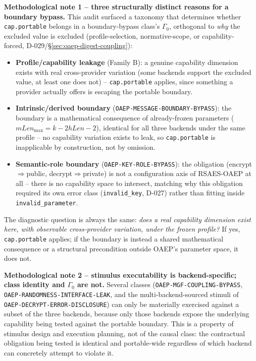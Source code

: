\documentclass[11pt,a4paper]{article}
\begin{document}
\textbf{Methodological note 1 -- three structurally distinct reasons for a boundary bypass.} This audit surfaced a taxonomy that determines whether \texttt{cap.portable} belongs in a boundary-bypass class's $\Gamma_0$, orthogonal to \emph{why} the excluded value is excluded (profile-selection, normative-scope, or capability-forced, D-029/\S\ref{sec:oaep-digest-coupling}):
\begin{itemize}
\item \textbf{Profile/capability leakage} (Family B): a genuine capability dimension exists with real cross-provider variation (some backends support the excluded value, at least one does not) -- \texttt{cap.portable} applies, since something a provider actually offers is escaping the portable boundary.
\item \textbf{Intrinsic/derived boundary} (\texttt{OAEP-MESSAGE-BOUNDARY-BYPASS}): the boundary is a mathematical consequence of already-frozen parameters ($mLen_{\max}=k-2hLen-2$), identical for all three backends under the same profile -- no capability variation exists to leak, so \texttt{cap.portable} is inapplicable by construction, not by omission.
\item \textbf{Semantic-role boundary} (\texttt{OAEP-KEY-ROLE-BYPASS}): the obligation (encrypt$\Rightarrow$public, decrypt$\Rightarrow$private) is not a configuration axis of RSAES-OAEP at all -- there is no capability space to intersect, matching why this obligation required its own error class (\texttt{invalid\_key}, D-027) rather than fitting inside \texttt{invalid\_parameter}.
\end{itemize}
The diagnostic question is always the same: \emph{does a real capability dimension exist here, with observable cross-provider variation, under the frozen profile?} If yes, \texttt{cap.portable} applies; if the boundary is instead a shared mathematical consequence or a structural precondition outside OAEP's parameter space, it does not.

\textbf{Methodological note 2 -- stimulus executability is backend-specific; class identity and $\Gamma_0$ are not.} Several classes (\texttt{OAEP-MGF-COUPLING-BYPASS}, \texttt{OAEP-RANDOMNESS-INTERFACE-LEAK}, and the multi-backend-sourced stimuli of \texttt{OAEP-DECRYPT-ERROR-DISCLOSURE}) can only be materially exercised against a subset of the three backends, because only those backends expose the underlying capability being tested against the portable boundary. This is a property of stimulus design and execution planning, not of the causal class: the contractual obligation being tested is identical and portable-wide regardless of which backend can concretely attempt to violate it.
\end{document}
